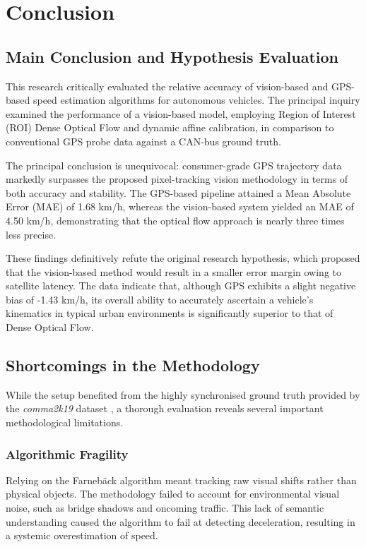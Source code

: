 \section{Conclusion}

\subsection{Main Conclusion and Hypothesis Evaluation}
This research critically evaluated the relative accuracy of vision-based and GPS-based speed estimation algorithms for autonomous vehicles. The principal inquiry examined the performance of a vision-based model, employing Region of Interest (ROI) Dense Optical Flow and dynamic affine calibration, in comparison to conventional GPS probe data against a CAN-bus ground truth.

The principal conclusion is unequivocal: consumer-grade GPS trajectory data markedly surpasses the proposed pixel-tracking vision methodology in terms of both accuracy and stability. The GPS-based pipeline attained a Mean Absolute Error (MAE) of 1.68 km/h, whereas the vision-based system yielded an MAE of 4.50 km/h, demonstrating that the optical flow approach is nearly three times less precise.

These findings definitively refute the original research hypothesis, which proposed that the vision-based method would result in a smaller error margin owing to satellite latency. The data indicate that, although GPS exhibits a slight negative bias of -1.43 km/h, its overall ability to accurately ascertain a vehicle’s kinematics in typical urban environments is significantly superior to that of Dense Optical Flow.

\subsection{Shortcomings in the Methodology}
While the setup benefited from the highly synchronised ground truth provided by the \textit{comma2k19} dataset \cite{schafer2018commute}, a thorough evaluation reveals several important methodological limitations.

\subsubsection{Algorithmic Fragility}
Relying on the Farnebäck algorithm meant tracking raw visual shifts rather than physical objects. The methodology failed to account for environmental visual noise, such as bridge shadows and oncoming traffic. This lack of semantic understanding caused the algorithm to fail at detecting deceleration, resulting in a systemic overestimation of speed.

